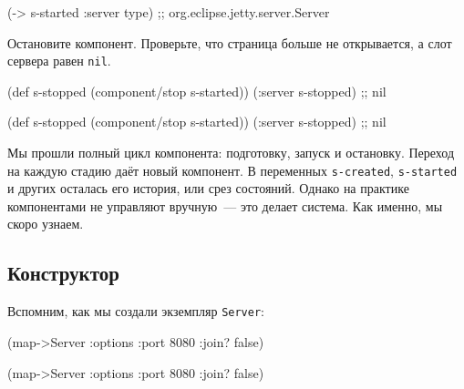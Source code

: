 \begin{english}
  \begin{clojure}
(-> s-started :server type)
;; org.eclipse.jetty.server.Server
  \end{clojure}
\end{english}

Остановите компонент. Проверьте, что страница больше не открывается, а слот
сервера равен \verb|nil|.

\ifx\DEVICETYPE\MOBILE

\begin{english}
  \begin{clojure}
(def s-stopped
  (component/stop s-started))
(:server s-stopped) ;; nil
  \end{clojure}
\end{english}

\else

\begin{english}
  \begin{clojure}
(def s-stopped (component/stop s-started))
(:server s-stopped) ;; nil
  \end{clojure}
\end{english}

\fi

Мы прошли полный цикл компонента: подготовку, запуск и остановку. Переход на
каждую стадию даёт новый компонент. В переменных \verb|s-created|,
\verb|s-started| и других осталась его история, или срез состояний. Однако на
практике компонентами не управляют вручную~--- это делает система. Как именно,
мы скоро узнаем.

\subsection{Конструктор}


Вспомним, как мы создали экземпляр \verb|Server|:

\ifx\DEVICETYPE\MOBILE

\begin{english}
  \begin{clojure}
(map->Server
  {:options {:port 8080
             :join? false}})
  \end{clojure}
\end{english}

\else

\begin{english}
  \begin{clojure}
(map->Server {:options {:port 8080 :join? false}})
  \end{clojure}
\end{english}

